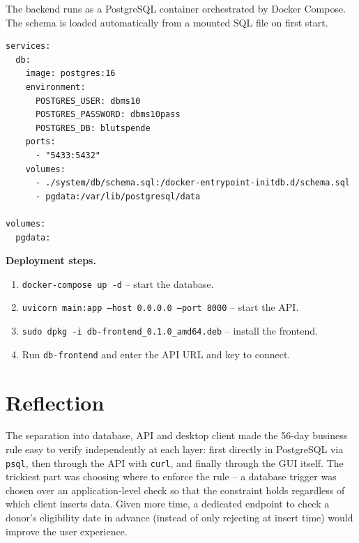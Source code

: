 \documentclass[11pt,a4paper]{article}
\begin{document}
The backend runs as a PostgreSQL container orchestrated by Docker Compose. The
schema is loaded automatically from a mounted SQL file on first start.

\begin{lstlisting}[caption={docker-compose.yml (excerpt)}]
services:
  db:
    image: postgres:16
    environment:
      POSTGRES_USER: dbms10
      POSTGRES_PASSWORD: dbms10pass
      POSTGRES_DB: blutspende
    ports:
      - "5433:5432"
    volumes:
      - ./system/db/schema.sql:/docker-entrypoint-initdb.d/schema.sql
      - pgdata:/var/lib/postgresql/data

volumes:
  pgdata:
\end{lstlisting}

\textbf{Deployment steps.}
\begin{enumerate}[leftmargin=1.6em, topsep=2pt]
  \item \texttt{docker-compose up -d} -- start the database.
  \item \texttt{uvicorn main:app --host 0.0.0.0 --port 8000} -- start the API.
  \item \texttt{sudo dpkg -i db-frontend\_0.1.0\_amd64.deb} -- install the frontend.
  \item Run \texttt{db-frontend} and enter the API URL and key to connect.
\end{enumerate}

\section{Reflection}

The separation into database, API and desktop client made the 56-day
business rule easy to verify independently at each layer: first directly in
PostgreSQL via \texttt{psql}, then through the API with \texttt{curl}, and
finally through the GUI itself. The trickiest part was choosing where to
enforce the rule -- a database trigger was chosen over an application-level
check so that the constraint holds regardless of which client inserts data.
Given more time, a dedicated endpoint to check a donor's eligibility date in
advance (instead of only rejecting at insert time) would improve the user
experience.
\end{document}
